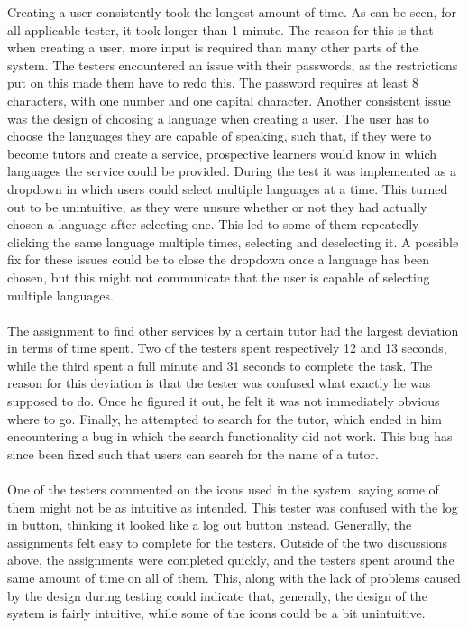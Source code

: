 Creating a user consistently took the longest amount of time.
As can be seen, for all applicable tester, it took longer than 1 minute.
The reason for this is that when creating a user, more input is required than many other parts of the system.
The testers encountered an issue with their passwords, as the restrictions put on this made them have to redo this.
The password requires at least 8 characters, with one number and one capital character.
Another consistent issue was the design of choosing a language when creating a user.
The user has to choose the languages they are capable of speaking, such that, if they were to become tutors and create a service, prospective learners would know in which languages the service could be provided.
During the test it was implemented as a dropdown in which users could select multiple languages at a time.
This turned out to be unintuitive, as they were unsure whether or not they had actually chosen a language after selecting one.
This led to some of them repeatedly clicking the same language multiple times, selecting and deselecting it.
A possible fix for these issues could be to close the dropdown once a language has been chosen, but this might not communicate that the user is capable of selecting multiple languages.
\\\\
The assignment to find other services by a certain tutor had the largest deviation in terms of time spent.
Two of the testers spent respectively 12 and 13 seconds, while the third spent a full minute and 31 seconds to complete the task.
The reason for this deviation is that the tester was confused what exactly he was supposed to do.
Once he figured it out, he felt it was not immediately obvious where to go.
Finally, he attempted to search for the tutor, which ended in him encountering a bug in which the search functionality did not work.
This bug has since been fixed such that users can search for the name of a tutor.
\\\\
One of the testers commented on the icons used in the system, saying some of them might not be as intuitive as intended.
This tester was confused with the log in button, thinking it looked like a log out button instead.
Generally, the assignments felt easy to complete for the testers.
Outside of the two discussions above, the assignments were completed quickly, and the testers spent around the same amount of time on all of them.
This, along with the lack of problems caused by the design during testing could indicate that, generally, the design of the system is fairly intuitive, while some of the icons could be a bit unintuitive. 

